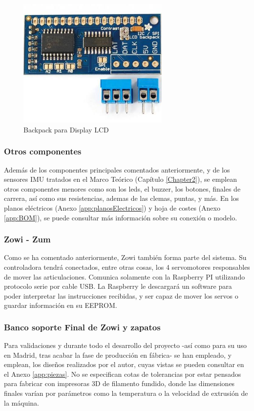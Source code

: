 \begin{figure}
\centering
\includegraphics[width=75mm]{Figures/backpack}
\caption{Backpack para Display LCD}
\label{fig:backpack}
\end{figure}

\subsubsection{Otros componentes}

Además de los componentes principales comentados anteriormente, y de los sensores IMU tratados en el Marco Teórico (Capítulo \ref{Chapter2}), se emplean otros componentes menores como son los leds, el buzzer, los botones, finales de carrera, así como sus resistencias, ademas de las clemas, puntas, y más. En los planos eléctricos (Anexo \ref{app:planosElectricos}) y hoja de costes (Anexo \ref{app:BOM}), se puede consultar más información sobre su conexión o modelo.

\subsubsection{Zowi - Zum}

Como se ha comentado anteriormente, Zowi también forma parte del sistema. Su controladora tendrá conectados, entre otras cosas, los 4 servomotores responsables de mover las articulaciones. Comunica solamente con la Raspberry PI utilizando protocolo serie por cable USB. La Raspberry le descargará un software para poder interpretar las instrucciones recibidas, y ser capaz de mover los servos o guardar información en su EEPROM.

\subsubsection{Banco soporte Final de Zowi y zapatos}

Para validaciones y durante todo el desarrollo del proyecto -así como para su uso en Madrid, tras acabar la fase de producción en fábrica- se han empleado, y emplean, los diseños realizados por el autor, cuyas vistas se pueden consultar en el Anexo \ref{app:piezas}. No se especifican cotas de tolerancias por estar pensados para fabricar con impresoras 3D de filamento fundido, donde las dimensiones finales varían por parámetros como la temperatura o la velocidad de extrusión de la máquina.

